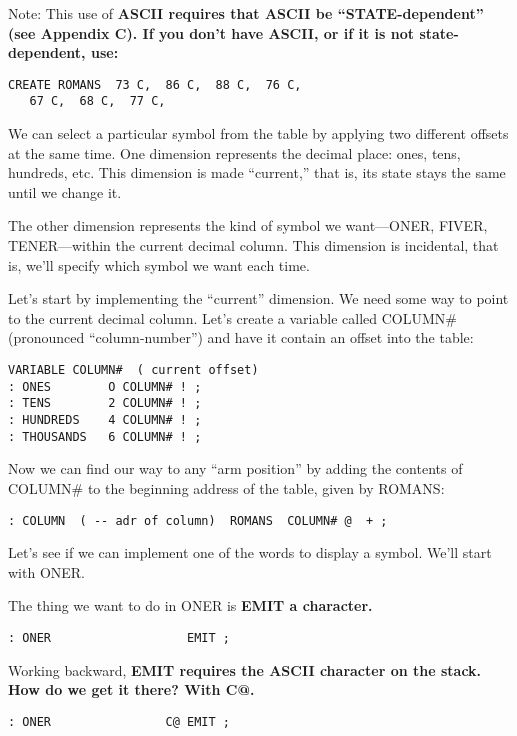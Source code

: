 Note: This use of \bf{ASCII} requires that \bf{ASCII} be
``\bf{STATE}-dependent'' (see Appendix C). If you don't have \bf{ASCII},
or if it is not state-dependent, use:

\begin{verbatim}
CREATE ROMANS  73 C,  86 C,  88 C,  76 C,
   67 C,  68 C,  77 C,
\end{verbatim}

We can select a particular symbol from the table by applying two
different offsets at the same time. One dimension represents the decimal
place: ones, tens, hundreds, etc. This dimension is made ``current,'' that
is, its state stays the same until we change it.

The other dimension represents the kind of symbol we want---ONER,
FIVER, TENER---within the current decimal column. This
dimension is incidental, that is, we'll specify which symbol we want each
time.

Let's start by implementing the ``current'' dimension. We need
some way to point to the current decimal column. Let's create a variable
called COLUMN\# (pronounced ``column-number'') and have it contain an
offset into the table:

\begin{verbatim}
VARIABLE COLUMN#  ( current offset)
: ONES        O COLUMN# ! ;
: TENS        2 COLUMN# ! ;
: HUNDREDS    4 COLUMN# ! ;
: THOUSANDS   6 COLUMN# ! ;
\end{verbatim}

Now we can find our way to any ``arm position'' by adding the contents of
COLUMN\# to the beginning address of the table, given by ROMANS:

\begin{verbatim}
: COLUMN  ( -- adr of column)  ROMANS  COLUMN# @  + ;
\end{verbatim}

Let's see if we can implement one of the words to display a symbol. We'll
start with ONER.

The thing we want to do in ONER is \bf{EMIT} a character.

\begin{verbatim}
: ONER                   EMIT ;
\end{verbatim}

Working backward, \bf{EMIT} requires the ASCII character on the stack.
How do we get it there? With \bf{C@}.

\begin{verbatim}
: ONER                C@ EMIT ;
\end{verbatim}


